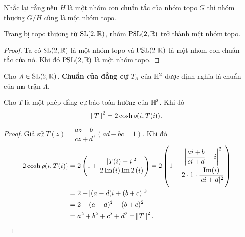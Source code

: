 

Nhắc lại rằng nếu $H$ là một nhóm con chuẩn tắc của nhóm topo $G$ thì nhóm thương $G/H$ cũng là một nhóm topo.

\begin{prop}
    Trang bị topo thương từ $\operatorname{SL}(2,\mathbb{R})$, nhóm $\operatorname{PSL}(2,\mathbb{R})$ trở thành một nhóm topo.
\end{prop}
\begin{proof}
    Ta có $\operatorname{SL}(2,\mathbb{R})$ là một nhóm topo và $\operatorname{PSL}(2,\mathbb{R})$ là một nhóm con chuẩn tắc của nó. Khi đó $\operatorname{PSL}(2,\mathbb{R})$
    là một nhóm topo.
\end{proof}

Cho $A \in \operatorname{SL}(2,\mathbb{R})$. \textbf{Chuẩn của đẳng cự $T_A$} của $\mathbb{H}^2$ được định nghĩa là chuẩn của ma trận $A$.
\begin{prop}
    Cho $T$ là một phép đẳng cự bảo toàn hướng của $\mathbb{H}^2$. Khi đó 
    \[ \norm{T}^2 = 2\cosh{\rho(i,T(i))}.\]
\end{prop}
\begin{proof}
    Giả sử $T(z) = \dfrac{az+b}{cz+d}, (ad-bc = 1)$. Khi đó
    \begin{align*}
        2\cosh{\rho(i,T(i))} &= 2\left(1+\dfrac{|T(i)-i|^2}{2\operatorname{Im}(i)\operatorname{Im} T(i)}\right)
        = 2\left(1+\dfrac{\left|\dfrac{ai+b}{ci+d}-i\right|^2}{2\cdot 1\cdot \dfrac{\operatorname{Im}(i)}{|ci+d|^2}}\right)\\
        &= 2+|(a-d)i + (b+c)|^2 \\
        &= 2 + (a-d)^2+(b+c)^2\\
        &= a^2+b^2+c^2+d^2  = \norm{T}^2.
    \end{align*}
\end{proof}

